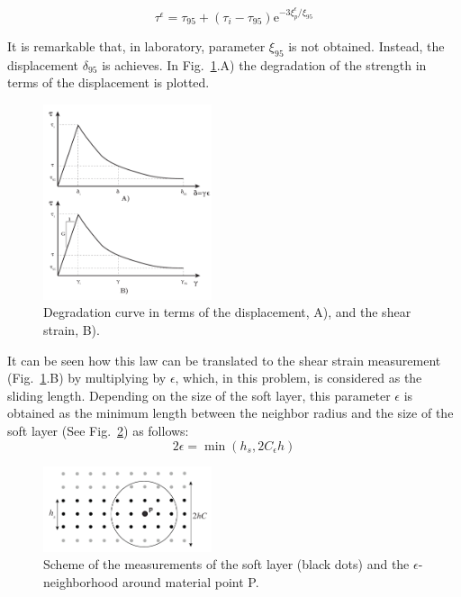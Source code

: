 \documentclass[applsci,journal,article,submit,moreauthors,pdftex]{Definitions/mdpi}
\begin{document}
\begin{equation} \label{eq19}
\tau^{\epsilon}=\tau_{95}+\left(\tau_{i}-\tau_{95}\right) \mathrm{e}^{-3 \xi^{\epsilon}_{p} / \xi_{95}}
\end{equation}

It is remarkable that, in laboratory, parameter $\xi_{95}$ is not obtained. Instead, the displacement $\delta_{95}$ is achieves. In Fig.~\ref{fig_deg}.A) the degradation of the strength in terms of the displacement is plotted.
\begin{figure}
\centering
\includegraphics[width=0.44\textwidth]{Figs/degradation.pdf}
\caption{Degradation curve in terms of the displacement, A), and the shear strain, B).}
\label{fig_deg}
\end{figure}
 It can be seen how this law can be translated to the shear strain measurement (Fig.~\ref{fig_deg}.B) by multiplying by $\epsilon$, which, in this problem, is considered as the sliding length. Depending on the size of the soft layer, this parameter $\epsilon$ is obtained as the minimum length between the neighbor radius and the size of the soft layer (See Fig.~\ref{fig_layer}) as follows:
 \begin{equation} \label{eq20}
2\epsilon = \min(h_s,2C_\epsilon h)
\end{equation}
\begin{figure}[ht]
\centering
\includegraphics[width=0.44\textwidth]{Figs/soft_layer.pdf}
\caption{Scheme of the measurements of the soft layer (black dots) and the $\epsilon$-neighborhood around material point P.}
\label{fig_layer}
\end{figure}
\end{document}
